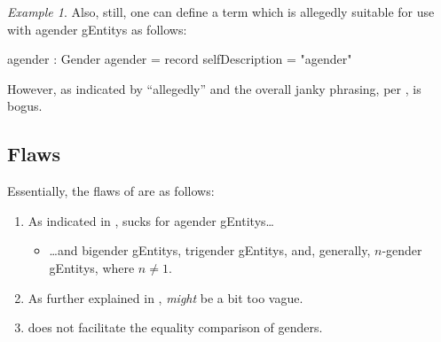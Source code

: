 \documentclass{article}
\theoremstyle{remark}
\newtheorem{example}{Example}
\begin{document}
\begin{example}
  Also, still, one can define a  term which is allegedly suitable for use with agender \glspl{gEntity} as follows:

  \begin{code}
    agender : Gender
    agender = record {selfDescription = "agender"}
  \end{code}

  However, as indicated by ``allegedly'' and the overall janky phrasing, per ,  is bogus.
\end{example}

\subsection{Flaws}\label{sec:gender1flaws}
Essentially, the flaws of  are as follows:

\begin{enumerate}
  \item As indicated in ,  sucks for agender \glspl{gEntity}\ldots{}\label{enum:gender1agender}
  \begin{itemize}
    \item \ldots and bigender \glspl{gEntity}, trigender \glspl{gEntity}, and, generally, \(n\)-gender \glspl{gEntity}, where \(n \neq 1\).
  \end{itemize}
  \item As further explained in ,  \emph{might} be a bit too vague.
  \item {} does not facilitate the equality comparison of genders.\label{enum:gender1stringComparison}
\end{enumerate}
\end{document}
